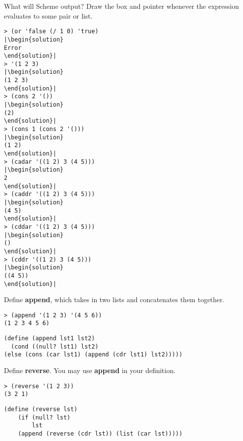 \question
What will Scheme output? Draw the box and pointer whenever the expression evaluates to some pair or list.

\begin{lstlisting}
> (or 'false (/ 1 0) 'true)
|\begin{solution}
Error
\end{solution}|
> '(1 2 3)
|\begin{solution}
(1 2 3)
\end{solution}|
> (cons 2 '())
|\begin{solution}
(2)
\end{solution}|
> (cons 1 (cons 2 '()))
|\begin{solution}
(1 2)
\end{solution}|
> (cadar '((1 2) 3 (4 5)))
|\begin{solution}
2
\end{solution}|
> (caddr '((1 2) 3 (4 5)))
|\begin{solution}
(4 5)
\end{solution}|
> (cddar '((1 2) 3 (4 5)))
|\begin{solution}
()
\end{solution}|
> (cddr '((1 2) 3 (4 5)))
|\begin{solution}
((4 5))
\end{solution}|
\end{lstlisting}


\question
Define \textbf{append}, which takes in two lists and concatenates them together.

\begin{lstlisting}
> (append '(1 2 3) '(4 5 6))
(1 2 3 4 5 6)
\end{lstlisting}

\begin{solution}
\begin{verbatim}
(define (append lst1 lst2)
  (cond ((null? lst1) lst2)
(else (cons (car lst1) (append (cdr lst1) lst2)))))
\end{verbatim}
\end{solution}
\newpage

\question
Define \textbf{reverse}. You may use \textbf{append} in your definition.

\begin{lstlisting}
> (reverse '(1 2 3))
(3 2 1)
\end{lstlisting}

\begin{solution}[0.5in]
\begin{verbatim}
(define (reverse lst)
    (if (null? lst)
        lst
    (append (reverse (cdr lst)) (list (car lst)))))
\end{verbatim}
\end{solution}

